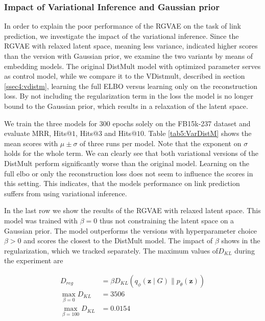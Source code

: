 \subsubsection{Impact of Variational Inference and Gaussian prior}

In order to explain the poor performance of the RGVAE on the task of link prediction, we investigate the impact of the variational inference. Since the RGVAE with relaxed latent space, meaning less variance, indicated higher scores than the version with Gaussian prior, we examine the two variants by means of embedding models. The original DistMult model with optimized parameter serves as control model, while we compare it to the VDistmult, described in section \ref{ssec4:vdistm}, learning the full ELBO versus learning only on the reconstruction loss. By not including the regularization term in the loss the model is no longer bound to the Gaussian prior, which results in a relaxation of the latent space.

We train the three models for $300$ epochs solely on the FB15k-237 dataset and evaluate MRR, Hits@$1$, Hits@$3$ and Hits@$10$. Table \ref{tab5:VarDistM} shows the mean scores with $\mu \pm \sigma$ of three runs per model. Note that the exponent on $\sigma$ holds for the whole term. We can clearly see that both variational versions of the DistMult perform significantly worse than the original model. Learning on the full elbo or only the reconstruction loss does not seem to influence the scores in this setting. This indicates, that the models performance on link prediction suffers from using variational inference.

In the last row we show the results of the RGVAE with relaxed latent space. This model was trained with $\beta=0$ thus not constraining the latent space on a Gaussian prior. The model outperforms the versions with hyperparameter choice $\beta>0$ and scores the closest to the DistMult model. The impact of $\beta$ shows in the regularization, which we tracked separately. The maximum values of$D_{K L}$ during the experiment are 

\begin{equation}
  \begin{align}
    D_{reg} &= \beta D_{K L}\left(q_{\phi}\left(\mathbf{z} \mid G\right) \| p_{\theta}(\mathbf{z})\right) \\
    \max_{\beta = 0} D_{K L} &= 3506 \\
    \max_{\beta = 100} D_{K L} &= 0.0154
  \end{align}
  \label{eq5:KLdifferentBeta}
\end{equation}


